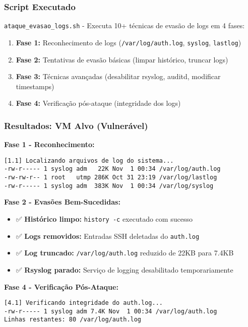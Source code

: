\documentclass[12pt]{article}
\begin{document}
\subsubsection{Script Executado}
\texttt{ataque\_evasao\_logs.sh} - Executa 10+ técnicas de evasão de logs em 4 fases:
\begin{enumerate}
    \item \textbf{Fase 1:} Reconhecimento de logs (\texttt{/var/log/auth.log}, \texttt{syslog}, \texttt{lastlog})
    \item \textbf{Fase 2:} Tentativas de evasão básicas (limpar histórico, truncar logs)
    \item \textbf{Fase 3:} Técnicas avançadas (desabilitar rsyslog, auditd, modificar timestamps)
    \item \textbf{Fase 4:} Verificação pós-ataque (integridade dos logs)
\end{enumerate}

\subsubsection{Resultados: VM Alvo (Vulnerável)}

\textbf{Fase 1 - Reconhecimento:}
\begin{verbatim}
[1.1] Localizando arquivos de log do sistema...
-rw-r----- 1 syslog adm   22K Nov  1 00:34 /var/log/auth.log
-rw-rw-r-- 1 root   utmp 286K Oct 31 23:19 /var/log/lastlog
-rw-r----- 1 syslog adm  383K Nov  1 00:34 /var/log/syslog
\end{verbatim}

\textbf{Fase 2 - Evasões Bem-Sucedidas:}
\begin{itemize}
    \item ✅ \textbf{Histórico limpo:} \texttt{history -c} executado com sucesso
    \item ✅ \textbf{Logs removidos:} Entradas SSH deletadas do \texttt{auth.log}
    \item ✅ \textbf{Log truncado:} \texttt{/var/log/auth.log} reduzido de 22KB para 7.4KB
    \item ✅ \textbf{Rsyslog parado:} Serviço de logging desabilitado temporariamente
\end{itemize}

\textbf{Fase 4 - Verificação Pós-Ataque:}
\begin{verbatim}
[4.1] Verificando integridade do auth.log...
-rw-r----- 1 syslog adm 7.4K Nov  1 00:34 /var/log/auth.log
Linhas restantes: 80 /var/log/auth.log
\end{verbatim}
\end{document}
